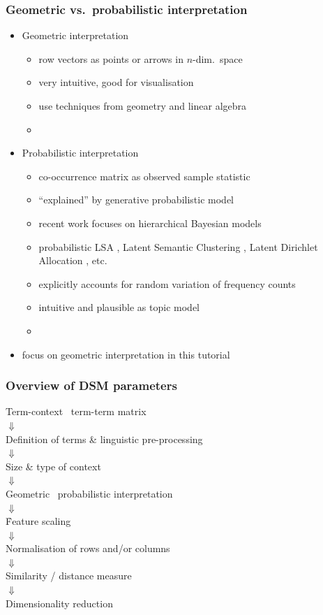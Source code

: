 \begin{frame}
  \frametitle{Geometric vs.\ probabilistic interpretation}

  \begin{itemize}
  \item Geometric interpretation
    \begin{itemize}
    \item row vectors as points or arrows in $n$-dim.\ space
    \item very intuitive, good for visualisation
    \item use techniques from geometry and linear algebra
    \item[]
    \end{itemize}
    \pause
  \item Probabilistic interpretation
    \begin{itemize}
    \item co-occurrence matrix as observed sample statistic
    \item ``explained'' by generative probabilistic model
    \item recent work focuses on hierarchical Bayesian models
    \item probabilistic LSA \citep{Hoffmann:99}, Latent Semantic
      Clustering \citep{Rooth:etc:99}, Latent Dirichlet Allocation
      \citep{Blei:Ng:Jordan:03}, etc.
    \item explicitly accounts for random variation of frequency counts
    \item intuitive and plausible as topic model
    \item[]
    \end{itemize}
    \pause
  \item[\hand] focus on geometric interpretation in this tutorial
  \end{itemize}
\end{frame}

\begin{frame}
  \frametitle{Overview of DSM parameters}

  \ungap[1]
  \begin{center}
    Term-context \vs\ term-term matrix\\
    $\Downarrow$\\
    Definition of terms \& linguistic pre-processing\\
    $\Downarrow$\\
    Size \& type of context\\
    $\Downarrow$\\
    Geometric \vs\ probabilistic interpretation\\
    $\Downarrow$\\
    \h{Feature scaling}\\
    $\Downarrow$\\
    Normalisation of rows and/or columns\\
    $\Downarrow$\\
    Similarity / distance measure\\
    $\Downarrow$\\
    Dimensionality reduction
  \end{center}
\end{frame}

